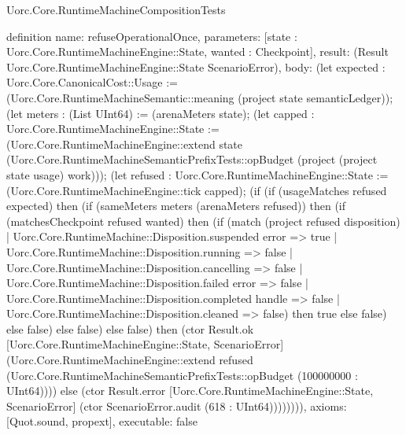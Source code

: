 \begin{lexlean}{Uorc.Core.RuntimeMachineCompositionTests}
\begin{semanticmodule}
definition{
  name: refuseOperationalOnce,
  parameters: [state : Uorc.Core.RuntimeMachineEngine::State, wanted : Checkpoint],
  result: (Result Uorc.Core.RuntimeMachineEngine::State ScenarioError),
  body: (let expected : Uorc.Core.CanonicalCost::Usage := (Uorc.Core.RuntimeMachineSemantic::meaning (project state semanticLedger)); (let meters : (List UInt64) := (arenaMeters state); (let capped : Uorc.Core.RuntimeMachineEngine::State := (Uorc.Core.RuntimeMachineEngine::extend state (Uorc.Core.RuntimeMachineSemanticPrefixTests::opBudget (project (project state usage) work))); (let refused : Uorc.Core.RuntimeMachineEngine::State := (Uorc.Core.RuntimeMachineEngine::tick capped); (if (if (usageMatches refused expected) then (if (sameMeters meters (arenaMeters refused)) then (if (matchesCheckpoint refused wanted) then (if (match (project refused disposition)
    | Uorc.Core.RuntimeMachine::Disposition.suspended error => true
    | Uorc.Core.RuntimeMachine::Disposition.running => false
    | Uorc.Core.RuntimeMachine::Disposition.cancelling => false
    | Uorc.Core.RuntimeMachine::Disposition.failed error => false
    | Uorc.Core.RuntimeMachine::Disposition.completed handle => false
    | Uorc.Core.RuntimeMachine::Disposition.cleaned => false) then true else false) else false) else false) else false) then (ctor Result.ok [Uorc.Core.RuntimeMachineEngine::State, ScenarioError] (Uorc.Core.RuntimeMachineEngine::extend refused (Uorc.Core.RuntimeMachineSemanticPrefixTests::opBudget (100000000 : UInt64)))) else (ctor Result.error [Uorc.Core.RuntimeMachineEngine::State, ScenarioError] (ctor ScenarioError.audit (618 : UInt64)))))))),
  axioms: [Quot.sound, propext],
  executable: false
}


\end{semanticmodule}
\end{lexlean}
